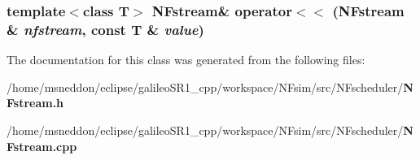 \subsubsection{\setlength{\rightskip}{0pt plus 5cm}template$<$class T$>$ {\bf NFstream}\& operator$<$$<$ ({\bf NFstream} \& {\em nfstream}, const T \& {\em value})\hspace{0.3cm}{\tt  [friend]}}\label{classNFstream_ef588953052314e1b69285568a59947f}




The documentation for this class was generated from the following files:\begin{CompactItemize}
\item 
/home/msneddon/eclipse/galileoSR1\_\-cpp/workspace/NFsim/src/NFscheduler/{\bf NFstream.h}\item 
/home/msneddon/eclipse/galileoSR1\_\-cpp/workspace/NFsim/src/NFscheduler/{\bf NFstream.cpp}\end{CompactItemize}
